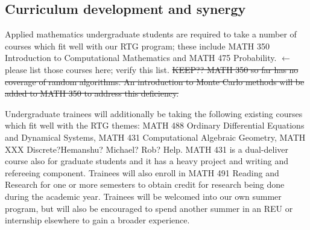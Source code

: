 \documentclass[11pt]{NSFamsart}
\begin{document}
\subsection*{Curriculum development and synergy} 

Applied mathematics undergraduate students are required to take a number of courses which fit well with our RTG program; these include MATH 350 Introduction to Computational Mathematics and MATH 475 Probability. {\color{red}$\leftarrow$ please list those courses here; verify this list.}  
\sout{KEEP?? MATH 350 so far has no coverage of random algorithms. An introduction to Monte Carlo methods will be added to MATH 350 to address this deficiency.} 

Undergraduate trainees will additionally be taking the following existing courses which fit well with the RTG themes: MATH 488 Ordinary Differential Equations and Dynamical Systems, MATH 431 Computational Algebraic Geometry, MATH XXX Discrete?{\color{red}Hemanshu? Michael? Rob? Help.}
MATH 431 is a dual-deliver course also for graduate students and it has  a heavy project and writing and refereeing component.  Trainees will also enroll in MATH 491 Reading and Research for one or more semesters to obtain credit for research being done during the academic year.  Trainees will be welcomed into our own summer program, but will also be encouraged to spend another summer in an REU or internship elsewhere to gain a broader experience.


\end{document}
